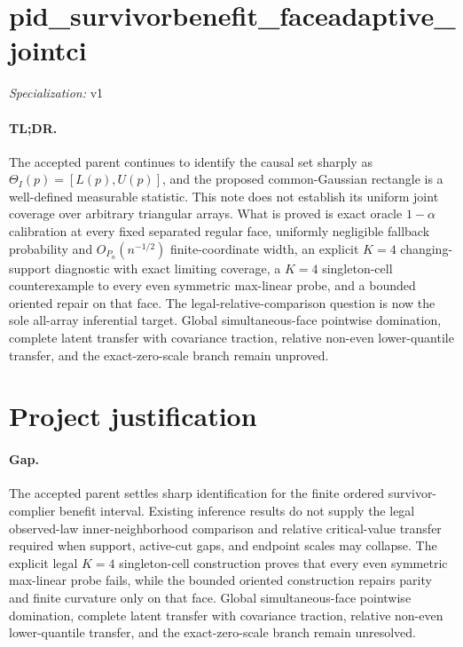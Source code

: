 \documentclass{article}
\begin{document}
\sloppy

\section*{pid\_\allowbreak{}survivorbenefit\_\allowbreak{}faceadaptive\_\allowbreak{}jointci}

\noindent\textit{Specialization:} v1\par

\paragraph{TL;DR.} The accepted parent continues to identify the causal set sharply as \(\Theta_I(p)=[L(p),U(p)]\), and the proposed common-Gaussian rectangle is a well-defined measurable statistic. This note does not establish its uniform joint coverage over arbitrary triangular arrays. What is proved is exact oracle \(1-\alpha\) calibration at every fixed separated regular face, uniformly negligible fallback probability and \(O_{P_n}(n^{-1/2})\) finite-coordinate width, an explicit \(K=4\) changing-support diagnostic with exact limiting coverage, a \(K=4\) singleton-cell counterexample to every even symmetric max-linear probe, and a bounded oriented repair on that face. The legal-relative-comparison question is now the sole all-array inferential target. Global simultaneous-face pointwise domination, complete latent transfer with covariance traction, relative non-even lower-quantile transfer, and the exact-zero-scale branch remain unproved.

\section{Project justification}

\paragraph{Gap.} The accepted parent settles sharp identification for the finite ordered survivor-complier benefit interval. Existing inference results do not supply the legal observed-law inner-neighborhood comparison and relative critical-value transfer required when support, active-cut gaps, and endpoint scales may collapse. The explicit legal \(K=4\) singleton-cell construction proves that every even symmetric max-linear probe fails, while the bounded oriented construction repairs parity and finite curvature only on that face. Global simultaneous-face pointwise domination, complete latent transfer with covariance traction, relative non-even lower-quantile transfer, and the exact-zero-scale branch remain unresolved.
\end{document}
